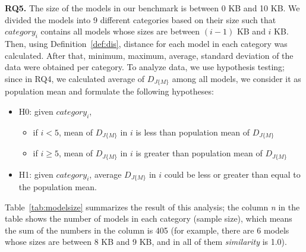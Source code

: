 \textbf{RQ5.} The size of the models in our benchmark is between 0 KB and 10 KB.
We divided the models into 9 different categories based on their size such that $category_i$ contains
all models whose sizes are between $(i - 1)$ KB and $i$ KB. Then, using Definition~\ref{def:dis}, distance for each model in each category was calculated. After that, minimum, maximum, average, standard deviation of the data were obtained per category. To analyze data, we use hypothesis testing; since in RQ4, we calculated average of $D_{J\{M\}}$ among all models, we consider it as population mean and formulate the following hypotheses:
\begin{itemize}
  \item H0: given $category_i$,
  \begin{itemize}
    \item if $i < 5$, mean of $D_{J\{M\}}$ in $i$ is less than population mean of $D_{J\{M\}}$
    \item if $i \geq 5$, mean of $D_{J\{M\}}$ in $i$ is greater than population mean of $D_{J\{M\}}$
  \end{itemize}
  \item H1: given $category_i$, average $D_{J\{M\}}$ in $i$ could be less or
  greater than equal to the population mean.
\end{itemize}

Table~\ref{tab:modelsize} summarizes the result of this analysis; the column \emph{n} in the table shows the number of models in each category (sample size), which means the sum of the numbers in the column is 405 (for example, there are 6 models whose sizes are between 8 KB and 9 KB, and in all of them \textit{similarity} is 1.0).


